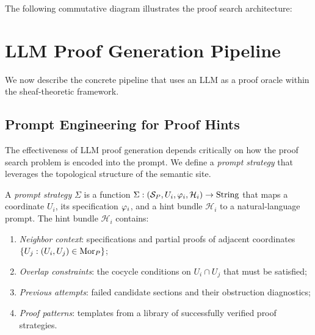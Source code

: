 \documentclass[11pt]{article}
\newcommand{\CandSpace}{\mathcal{C}}
\newcommand{\PromptStrat}{\Sigma}
\newcommand{\HintBundle}{\mathcal{H}}
\newcommand{\ProofSheaf}{\mathscr{P}}
\begin{document}
The following commutative diagram illustrates the proof search
architecture:

\begin{center}
\end{center}


\section{LLM Proof Generation Pipeline}\label{sec:llm-pipeline}

We now describe the concrete pipeline that uses an LLM as a proof
oracle within the sheaf-theoretic framework.

\subsection{Prompt Engineering for Proof Hints}\label{subsec:prompts}

The effectiveness of LLM proof generation depends critically on how
the proof search problem is encoded into the prompt.  We define a
\emph{prompt strategy} that leverages the topological structure of the
semantic site.

\begin{definition}\label{def:prompt-strategy}
A \emph{prompt strategy} $\PromptStrat$ is a function
$\PromptStrat : (\Site_P, U_i, \prop_i, \HintBundle_i) \to
\mathrm{String}$ that maps a coordinate $U_i$, its specification
$\varphi_i$, and a hint bundle $\HintBundle_i$ to a natural-language
prompt.  The hint bundle $\HintBundle_i$ contains:
\begin{enumerate}[label=(\alph*)]
  \item \emph{Neighbor context}: specifications and partial proofs
    of adjacent coordinates $\{U_j : (U_i, U_j) \in \mathrm{Mor}_P\}$;
  \item \emph{Overlap constraints}: the cocycle conditions on
    $U_i \cap U_j$ that must be satisfied;
  \item \emph{Previous attempts}: failed candidate sections and their
    obstruction diagnostics;
  \item \emph{Proof patterns}: templates from a library of
    successfully verified proof strategies.
\end{enumerate}
\end{definition}
\end{document}
